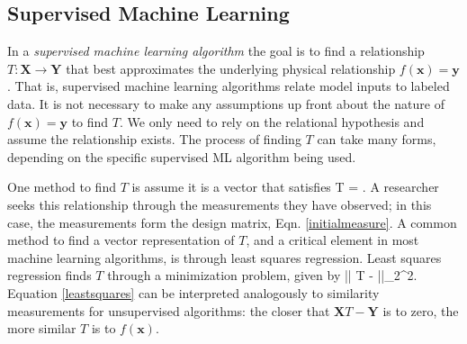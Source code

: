 \subsection{Supervised Machine Learning}
In a \textit{supervised machine learning algorithm} the goal is to find a relationship $T: \mathbf{X} \to \mathbf{Y}$ that best approximates the underlying physical relationship $f(\mathbf{x}) = \mathbf{y}$. That is, supervised machine learning algorithms relate model inputs to labeled data. It is not necessary to make any assumptions up front about the nature of $f(\mathbf{x}) = \mathbf{y}$ to find $T$. We only need to rely on the relational hypothesis and assume the relationship exists. The process of finding $T$ can take many forms, depending on the specific supervised ML algorithm being used.

One method to find $T$ is assume it is a vector that satisfies
\eqn
{}T = .
\label{map}
\equ
A researcher seeks this relationship through the measurements they have observed; in this case, the measurements form the design matrix, Eqn. \ref{initialmeasure}. A common method to find a vector representation of $T$, and a critical element in most machine learning algorithms, is through least squares regression. Least squares regression finds $T$ through a minimization problem, given by
\eqn
\min || T -  ||_{2}^{2}.
\label{leastsquares}
\equ
Equation \ref{leastsquares} can be interpreted analogously to similarity measurements for unsupervised algorithms: the closer that $\mathbf{X}T - \mathbf{Y}$ is to zero, the more similar $T$ is to $f(\mathbf{x})$. 



